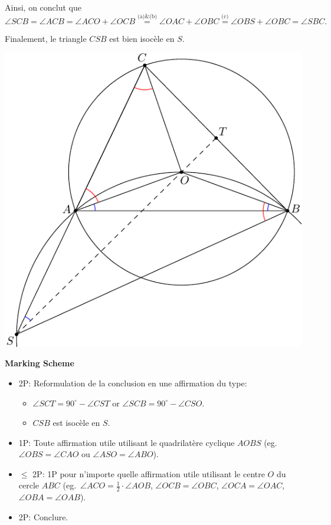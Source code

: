 {Ainsi, on conclut que
\[
\angle SCB=\angle ACB=\angle ACO+\angle OCB\stackrel{\text{(a)\&(b)}}{=}\angle OAC+\angle OBC\stackrel{\text{(c)}}{=}\angle OBS+\angle OBC=\angle SBC.
\]

Finalement, le triangle $CSB$ est bien isocèle en $S$.

\begin{center}
\includegraphics{g1fig.pdf}
\end{center}

\bigskip

\textbf{Marking Scheme}

\begin{itemize}
    \item 2P: Reformulation de la conclusion en une affirmation du type:
    \begin{itemize}
    \item $\angle SCT=90^\circ-\angle CST$ or $\angle SCB=90^\circ-\angle CSO$.
    \item $CSB$ est isocèle en $S$.
    \end{itemize}
    \item 1P: Toute affirmation utile utilisant le quadrilatère cyclique $AOBS$ (eg.\ $\angle OBS=\angle CAO$ ou $\angle ASO=\angle ABO$).
    \item $\leq$ 2P: 1P pour n'importe quelle affirmation utile utilisant le centre $O$ du cercle $ABC$ (eg.\ $\angle ACO=\frac{1}{2}\cdot \angle AOB$, $\angle OCB=\angle OBC$, $\angle OCA=\angle OAC$, $\angle OBA=\angle OAB$).
    \item 2P: Conclure.
\end{itemize}

}